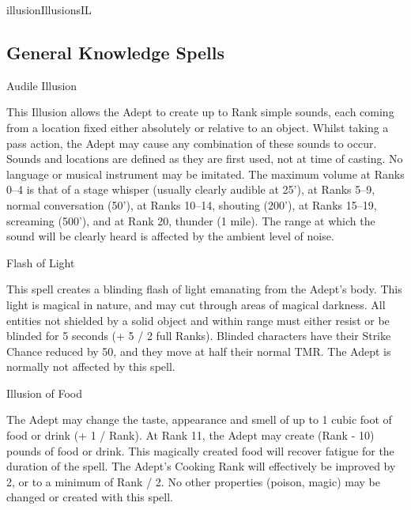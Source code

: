 \begin{college}[1.4]{illusion}{Illusions}{IL}
\subsection{General Knowledge Spells}

\begin{spell}[G-1]{Audile Illusion}

\begin{effects}
This Illusion allows the Adept to create up to Rank simple sounds,
each coming from a location fixed either absolutely or relative to an
object. Whilst taking a pass action, the Adept may cause any
combination of these sounds to occur. Sounds and locations are defined
as they are first used, not at time of casting. No language or musical
instrument may be imitated. The maximum volume at Ranks 0--4 is that of
a stage whisper (usually clearly audible at 25'), at Ranks 5--9, normal
conversation (50'), at Ranks 10--14, shouting (200'), at Ranks 15--19,
screaming (500'), and at Rank 20, thunder (1 mile). The range at which
the sound will be clearly heard is affected by the ambient level of
noise.
\end{effects}
\end{spell}

\begin{spell}[G-2]{Flash of Light}

\begin{effects}
This spell creates a blinding flash of light emanating from the
Adept's body. This light is magical in nature, and may cut through
areas of magical darkness. All entities not shielded by a solid object
and within range must either resist or be blinded for 5 seconds (+ 5 /
2 full Ranks). Blinded characters have their Strike Chance reduced by
50, and they move at half their normal TMR. The Adept is normally not
affected by this spell.
\end{effects}
\end{spell}

\begin{spell}[G-3]{Illusion of Food}

\begin{effects}
The Adept may change the taste, appearance and smell of up to 1 cubic
foot of food or drink (+ 1 / Rank). At Rank 11, the Adept may create
(Rank - 10) pounds of food or drink. This magically created food will
recover fatigue for the duration of the spell. The Adept's Cooking
Rank will effectively be improved by 2, or to a minimum of Rank / 2.
No other properties (\eg poison, magic) may be changed or created with
this spell.
\end{effects}
\end{spell}


\end{college}
